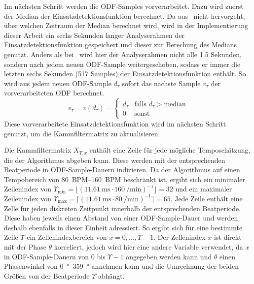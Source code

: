 {{			%
			Im nächsten Schritt werden die ODF-Samples vorverarbeitet.
			Dazu wird zuerst der Median der Einsatzdetektionsfunktion berechnet.
			Da aus~\cite{2011_PlRoSt} nicht hervorgeht,
				über welchen Zeitraum der Median berechnet wird,
				wird in der Implementierung dieser Arbeit
				ein sechs Sekunden langer Analyserahmen der Einsatzdetektionsfunktion gespeichert
				und dieser zur Berechung des Medians genutzt.
			Anders als bei~\cite{2009_DaPlSt} wird hier der Analyserahmen nicht alle \num{1.5} Sekunden,
				sondern nach jedem neuen ODF-Sample weitergeschoben,
				sodass er immer die letzten sechs Sekunden (\num{517} Samples) der Einsatzdetektionsfunktion enthält.
			So wird aus jedem neuen ODF-Sample $d_\tau$ sofort das nächste Sample $v_\tau$ der vorverarbeiteten ODF berechnet.
			\begin{equation}
				v_\tau = v(d_\tau) =
				\begin{cases}
					d_\tau & \text{falls } d_\tau > \text{median} \\
					0    & \text{sonst}
				\end{cases}
			\end{equation}
			Diese vorverarbeitete Einsatzdetektionsfunktion wird im nächsten Schritt genutzt,
				um die Kammfiltermatrix zu aktualisieren.

			Die Kammfiltermatrix $X_{\Upsilon, x}$ enthält eine Zeile für jede mögliche Temposchätzung, die der Algorithmus abgeben kann.
			Diese werden mit der entsprechenden Beatperiode in ODF-Sample-Dauern indizieren.
			Da der Algorithmus auf einen Tempobereich von \SIrange{80}{160}{BPM} beschränkt ist,
				ergibt sich ein minimaler Zeilenindex von
				$\Upsilon_{\text{min}} = \lfloor(\SI{11.61}{\milli\second} \cdot \SI{160}{\per\minute})^{-1}\rfloor = 32$
				und ein maximaler Zeilenindex von
				$\Upsilon_{\text{max}} = \lceil(\SI{11.61}{\milli\second} \cdot \SI{80}{\per\minute})^{-1}\rceil = 65$.
			Jede Zeile enthält eine Zelle für jeden diskreten Zeitpunkt innerhalb der entsprechenden Beatperiode.
			Diese haben jeweils einen Abstand von einer ODF-Sample-Dauer
				und werden deshalb ebenfalls in dieser Einheit adressiert.
			So ergibt sich für eine bestimmte Zeile $\Upsilon$ ein Zellenindexbereich von $x = 0, ..., \Upsilon - 1$.
			Der Zellenindex $x$ ist direkt mit der Phase $\theta$ korreliert,
				jedoch wird hier eine andere Variable verwendet,
				da $x$ in ODF-Sample-Dauern von $0$ bis $\Upsilon - 1$ angegeben werden kann
				und $\theta$ einen Phasenwinkel von \SIrange{0}{359}{\degree} annehmen kann
				und die Umrechnung der beiden Grö{\ss}en von der Beatperiode $\Upsilon$ abhängt.

}}
